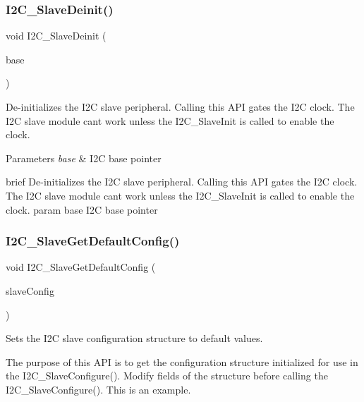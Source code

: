 \subsubsection{\texorpdfstring{I2C\_SlaveDeinit()}{I2C\_SlaveDeinit()}}
{\footnotesize\ttfamily void I2\+C\+\_\+\+Slave\+Deinit (\begin{DoxyParamCaption}\item[{\mbox{\hyperlink{struct_i2_c___type}{I2\+C\+\_\+\+Type}} $\ast$}]{base }\end{DoxyParamCaption})}



De-\/initializes the I2C slave peripheral. Calling this A\+PI gates the I2C clock. The I2C slave module can\textquotesingle{}t work unless the I2\+C\+\_\+\+Slave\+Init is called to enable the clock. 


\begin{DoxyParams}{Parameters}
{\em base} & I2C base pointer\\
\hline
\end{DoxyParams}
brief De-\/initializes the I2C slave peripheral. Calling this A\+PI gates the I2C clock. The I2C slave module can\textquotesingle{}t work unless the I2\+C\+\_\+\+Slave\+Init is called to enable the clock. param base I2C base pointer \mbox{\label{group__i2c__driver_ga7115f80e28b62bbbd3be1a2a918529ba}} 
\subsubsection{\texorpdfstring{I2C\_SlaveGetDefaultConfig()}{I2C\_SlaveGetDefaultConfig()}}
{\footnotesize\ttfamily void I2\+C\+\_\+\+Slave\+Get\+Default\+Config (\begin{DoxyParamCaption}\item[{\mbox{\hyperlink{group__i2c__driver_gaa70dd0ec9815617269569190efd2de5d}{i2c\+\_\+slave\+\_\+config\+\_\+t}} $\ast$}]{slave\+Config }\end{DoxyParamCaption})}



Sets the I2C slave configuration structure to default values. 

The purpose of this A\+PI is to get the configuration structure initialized for use in the I2\+C\+\_\+\+Slave\+Configure(). Modify fields of the structure before calling the I2\+C\+\_\+\+Slave\+Configure(). This is an example. 
\begin{DoxyCode}{0}
\end{DoxyCode}
 
